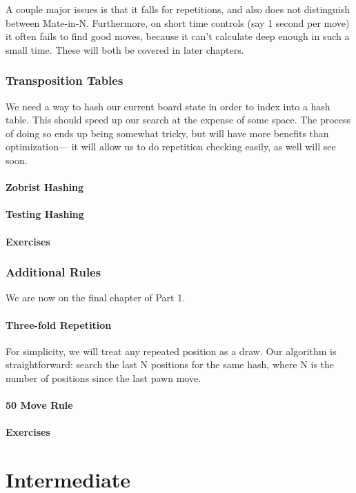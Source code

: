 \documentclass{article}
\begin{document}
A couple major issues is that it falls for repetitions, and also does not distinguish between Mate-in-N. Furthermore, on short time controls (say 1 second per move) it often fails to find good moves, because it can't calculate deep enough in such a small time. These will both be covered in later chapters.

\section{Transposition Tables}

We need a way to hash our current board state in order to index into a hash table. This should speed up our search at the expense of some space.
The process of doing so ends up being somewhat tricky, but will have more benefits than optimization--- it will allow us to do repetition checking easily, as well will see soon.

\subsection{Zobrist Hashing}
\subsection{Testing Hashing}
\subsection{Exercises}

\section{Additional Rules}
We are now on the final chapter of Part 1.
\subsection{Three-fold Repetition}
For simplicity, we will treat any repeated position as a draw.
Our algorithm is straightforward: search the last N positions for the same hash, where N is the number of positions since the last pawn move.
\subsection{50 Move Rule}
\subsection{Exercises}

\newpage
\part{Intermediate}
\end{document}
